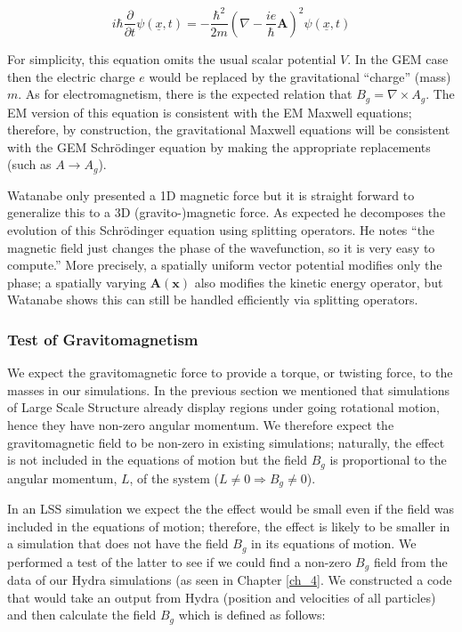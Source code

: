 \begin{equation}
i\hbar\frac{\partial}{\partial t}\psi(\underline{x},t) =-\frac{\hbar^2}{2m}\left(\nabla-\frac{ie}{\hbar}\mathbf{A}\right)^2 \psi(\underline{x},t)
\end{equation}

\noindent For simplicity, this equation omits the usual scalar potential $V$. In the GEM case then the electric charge $e$ would be replaced by the gravitational ``charge'' (mass) $m$. As for electromagnetism, there is the expected relation that $B_g = \nabla \times A_g$. The EM version of this equation is consistent with the EM Maxwell equations; therefore, by construction, the gravitational Maxwell equations will be consistent with the GEM Schr\"odinger equation by making the appropriate replacements (such as $A \rightarrow A_g$).

Watanabe only presented a 1D magnetic force but it is straight forward to generalize this to a 3D (gravito-)magnetic force. As expected he decomposes the evolution of this Schr\"odinger equation using splitting operators. He notes ``the magnetic field just changes the phase of the wavefunction, so it is very easy to compute.'' More precisely, a spatially uniform vector potential modifies only the phase; a spatially varying $\mathbf{A}(\mathbf{x})$ also modifies the kinetic energy operator, but Watanabe shows this can still be handled efficiently via splitting operators.

\subsubsection{Test of Gravitomagnetism}
We expect the gravitomagnetic force to provide a torque, or twisting force, to the masses in our simulations. In the previous section we mentioned that simulations of Large Scale Structure already display regions under going rotational motion, hence they have non-zero angular momentum. We therefore expect the gravitomagnetic field to be non-zero in existing simulations; naturally, the effect is not included in the equations of motion but the field $B_g$ is proportional to the angular momentum, $L$, of the system ($L\neq 0 \Rightarrow B_g \neq 0$).

In an LSS simulation we expect the the effect would be small even if the field was included in the equations of motion; therefore, the effect is likely to be smaller in a simulation that does not have the field $B_g$ in its equations of motion. We performed a test of the latter to see if we could find a non-zero $B_g$ field from the data of our Hydra simulations (as seen in Chapter \ref{ch_4}. We constructed a code that would take an output from Hydra (position and velocities of all particles) and then calculate the field $B_g$ which is defined as follows:

